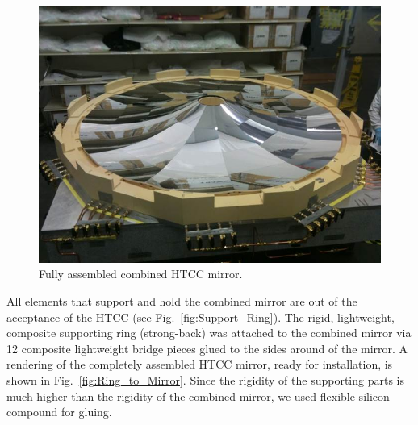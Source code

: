  \begin{figure}[ht]
    \centering
    \includegraphics[width=1.0\linewidth]{images/Compl_Assembl_MIR.jpg}
    \caption{Fully assembled combined HTCC mirror.}
    \label{fig:Compl_Assembl_MIR}
\end{figure}

All elements that support and hold the combined mirror are out of the acceptance of the HTCC (see
Fig.~\ref{fig:Support_Ring}). The rigid, lightweight, composite supporting ring (strong-back) was attached to
the combined mirror via 12 composite lightweight bridge pieces glued to the sides around of the mirror. A
rendering of the completely assembled HTCC mirror, ready for installation, is shown in
Fig.~\ref{fig:Ring_to_Mirror}. Since the rigidity of the supporting parts is much higher than the rigidity of
the combined mirror, we used flexible silicon compound for gluing.
  

